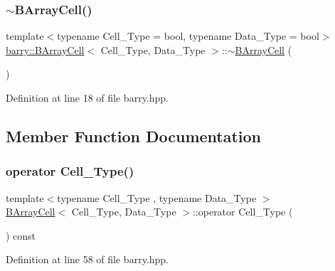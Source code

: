 \subsubsection{\texorpdfstring{$\sim$\+B\+Array\+Cell()}{~BArrayCell()}}
{\footnotesize\ttfamily template$<$typename Cell\+\_\+\+Type  = bool, typename Data\+\_\+\+Type  = bool$>$ \\
\hyperlink{classbarry_1_1_b_array_cell}{barry\+::\+B\+Array\+Cell}$<$ Cell\+\_\+\+Type, Data\+\_\+\+Type $>$\+::$\sim$\hyperlink{classbarry_1_1_b_array_cell}{B\+Array\+Cell} (\begin{DoxyParamCaption}{ }\end{DoxyParamCaption})\hspace{0.3cm}{\ttfamily [inline]}}



Definition at line 18 of file barry.\+hpp.



\subsection{Member Function Documentation}
\mbox{\label{classbarry_1_1_b_array_cell_a698f664c230f91bf03a97966378e339b}} 
\subsubsection{\texorpdfstring{operator Cell\+\_\+\+Type()}{operator Cell\_Type()}}
{\footnotesize\ttfamily template$<$typename Cell\+\_\+\+Type , typename Data\+\_\+\+Type $>$ \\
\hyperlink{classbarry_1_1_b_array_cell}{B\+Array\+Cell}$<$ Cell\+\_\+\+Type, Data\+\_\+\+Type $>$\+::operator Cell\+\_\+\+Type (\begin{DoxyParamCaption}{ }\end{DoxyParamCaption}) const\hspace{0.3cm}{\ttfamily [inline]}}



Definition at line 58 of file barry.\+hpp.

\mbox{\label{classbarry_1_1_b_array_cell_abc193e5d3dd8d04e5d4bb8d808fde35d}} 
